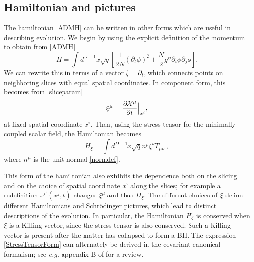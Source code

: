 \documentclass[11pt]{article}
\numberwithin{equation}{section}
\newcommand{\beq}{\begin{equation}}
\newcommand{\eeq}{\end{equation}}
\begin{document}
\subsection{Hamiltonian and pictures}\label{HandP}

The hamiltonian \eqref{ADMH} can be written in other forms which are useful in describing evolution. We begin by using  the explicit definition of the 
momentum to obtain from \eqref{ADMH}
\beq\label{LapseForm}
H= \int d^{D-1}x \sqrt{q} \left[\frac{1}{2N} (\partial_t\phi)^2+\frac{N}{2}g^{ij} \partial_i \phi \partial_j \phi \right].
\eeq 
We can rewrite this in terms of a vector $\xi=\partial_t$, which connects points on neighboring slices with equal spatial coordinates.
In component form, this becomes from \eqref{sliceparam}
\beq
\xi^{\mu} = \frac{\partial {\cal X}^{\mu}}{\partial t}\Big\vert_{x^i},
\eeq 
at fixed spatial coordinate $x^i$. Then, using the stress tensor for the minimally coupled scalar field, the  Hamiltonian becomes
\beq\label{StressTensorForm}
H_{\xi}= \int d^{D-1}x \sqrt{q} n^{\mu} \xi^{\nu} T_{\mu\nu}\ ,
\eeq
where $n^{\mu}$ is the unit normal \eqref{normdef}. 

This form of the hamiltonian also exhibits the dependence both on the slicing and on the choice of spatial coordinate $x^i$ along the slices; for example a redefinition $x^{i\prime}(x^j,t)$ changes $\xi^\mu$ and thus $H_\xi$.  The different choices of $\xi$ define different Hamiltonians and Schr\"odinger pictures,  which lead to distinct descriptions of the evolution.  In particular, the Hamiltonian $H_{\xi}$ is conserved when $\xi$ is a Killing vector, since the stress tensor is also conserved. Such a Killing vector is present after the  matter has collapsed to form a BH.  The expression \eqref{StressTensorForm} can alternately be derived in the covariant canonical formalism; see {\it e.g.} appendix B of \cite{DoGi2} for a review.
\end{document}

